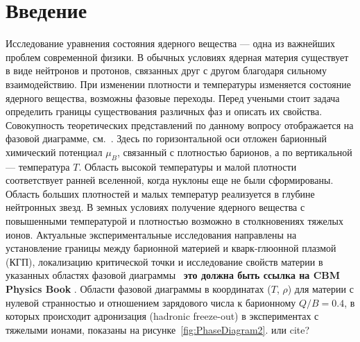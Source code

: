 \chapter*{Введение}\label{sec:secIntro}


Исследование уравнения состояния ядерного вещества --- одна из важнейших проблем современной физики. В обычных условиях ядерная материя существует в виде нейтронов и протонов, связанных друг с другом благодаря сильному взаимодействию. При изменении плотности и температуры изменяется состояние ядерного вещества, возможны фазовые переходы. Перед учеными стоит задача определить границы существования различных фаз и описать их свойства. Совокупность теоретических представлений по данному вопросу отображается на фазовой диаграмме, см.~. Здесь по горизонтальной оси отложен барионный химический потенциал $\mu_{B}$, связанный с плотностью барионов, а по вертикальной --- температура $T$. Область высокой температуры и малой плотности соответствует ранней вселенной, когда нуклоны еще не были сформированы. Область больших плотностей и малых температур реализуется в глубине нейтронных звезд. В земных условиях получение ядерного вещества с повышенными температурой и плотностью возможно в столкновениях тяжелых ионов. Актуальные экспериментальные исследования направлены на установление границы между барионной материей и кварк-глюонной плазмой (КГП), локализацию критической точки и исследование свойств материи в указанных областях фазовой диаграммы~\cite{CBMBook} \todo \textbf{это должна быть ссылка на CBM Physics Book} \todo. Области фазовой диаграммы в координатах ($T$, $\rho$) для материи с нулевой странностью и отношением зарядового числа к барионному $Q/B=0.4$, в которых происходит адронизация (hadronic freeze-out) в экспериментах с тяжелыми ионами, показаны на рисунке~\ref{fig:PhaseDiagram2}. \todo или cite?

